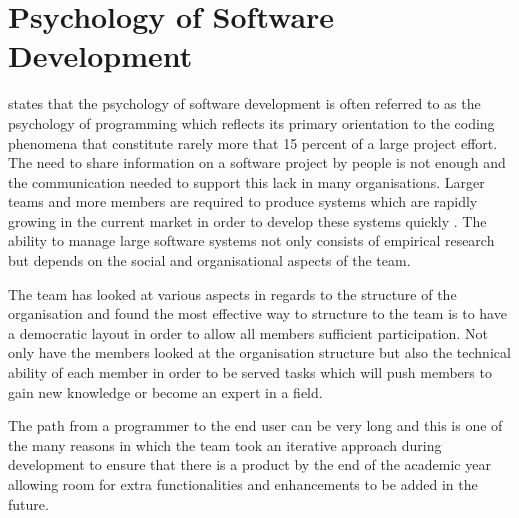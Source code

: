 \section{Psychology of Software Development}
\label{sec:psychology_of_software_development}

\citet{progpro86} states that the psychology of software development is often referred to as the psychology of programming which reflects its primary orientation to the coding phenomena that constitute rarely more that 15 percent of a large project effort. The need to share information on a software project by people is not enough and the communication needed to support this lack in many organisations. Larger teams and more members are required to produce systems which are rapidly growing in the current market in order to develop these systems quickly \citep{see81}. The ability to manage large software systems not only consists of empirical research but depends on the social and organisational aspects of the team. 

The team has looked at various aspects in regards to the structure of the organisation and found the most effective way to structure to the team is to have a democratic layout in order to allow all members sufficient participation. Not only have the members looked at the organisation structure but also the technical ability of each member in order to be served tasks which will push members to gain new knowledge or become an expert in a field. 

The path from a programmer to the end user can be very long and this is one of the many reasons in which the team took an iterative approach during development to ensure that there is a product by the end of the academic year allowing room for extra functionalities and enhancements to be added in the future.
